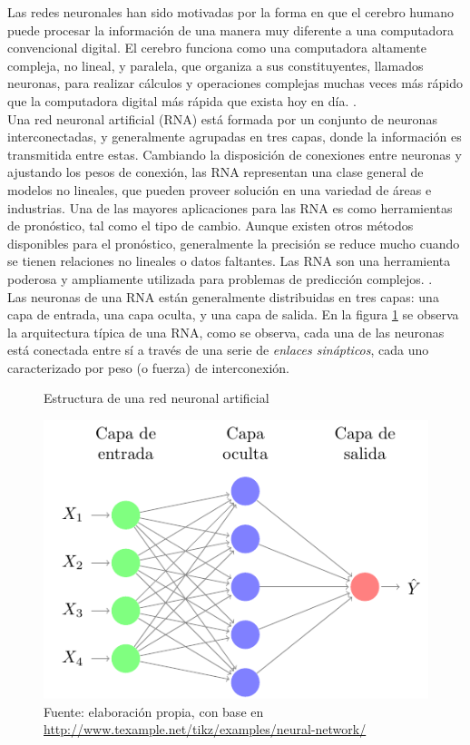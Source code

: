 Las redes neuronales han sido motivadas por la forma en que el cerebro humano puede procesar la información de una manera muy diferente a una computadora convencional digital. El cerebro funciona como una computadora altamente compleja, no lineal, y paralela, que organiza a sus constituyentes, llamados neuronas, para realizar cálculos y operaciones complejas muchas veces más rápido que la computadora digital más rápida que exista hoy en día. \parencite{haykin1999neural}.\\

Una red neuronal artificial (RNA) está formada por un conjunto de neuronas interconectadas, y generalmente agrupadas en tres capas, donde la información es transmitida entre estas. Cambiando la disposición de conexiones entre neuronas y ajustando los pesos de conexión, las RNA representan una clase general de modelos no lineales, que pueden proveer solución en una variedad de áreas e industrias. Una de las mayores aplicaciones para las RNA es como herramientas de pronóstico, tal como el tipo de cambio. Aunque existen otros métodos disponibles para el pronóstico, generalmente la precisión se reduce mucho cuando se tienen relaciones no lineales o datos faltantes. Las RNA son una herramienta poderosa y ampliamente utilizada para problemas de predicción complejos. \parencite{sunythesis}.\\

Las neuronas de una RNA están generalmente distribuidas en tres capas: una capa de entrada, una capa oculta, y una capa de salida. En la figura \ref{ann_structure} se observa la arquitectura típica de una RNA, como se observa, cada una de las neuronas está conectada entre sí a través de una serie de \textit{enlaces sinápticos}, cada uno caracterizado por peso (o fuerza) de interconexión.\\

\begin{figure}[ht]
	\centering
	\caption{Estructura de una red neuronal artificial}
	\label{ann_structure}
	\includegraphics[width=0.8\linewidth]{figuras/neuralNetwork.pdf}
	\caption*{Fuente: elaboración propia, con base en\\ \url{http://www.texample.net/tikz/examples/neural-network/}}
\end{figure}

